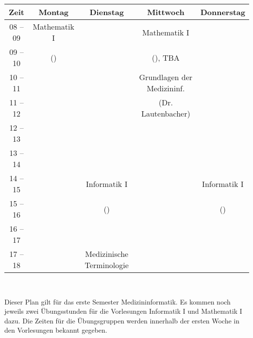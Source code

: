 \begin{minipage}{\textwidth}
    \footnotesize
\begin{center}
\begin{tabular}{|c|c|c|c|c|} 
	\hline
	Zeit    & Montag       & Dienstag             & Mittwoch                          & Donnerstag                          \\ 
	\hline\hline
	08 – 09 & Mathematik I &                      & Mathematik I                      &                                   \\ 
	\cline{1-1}\cline{3-3}\cline{5-5}
	09 – 10 & (\Matheprof)      &                      & (\Matheprof), TBA                           &   \\ 
	\hline
	10 – 11 &              &                      &     Grundlagen der Medizininf.                              &                                   \\ 
	\cline{1-3}\cline{5-5}
	11 – 12 &              &                      &    (Dr. Lautenbacher)             &                                   \\ 
	\hline
	12 – 13 &              &                      &                                   &                                   \\ 
	\hline
	13 – 14 &              &                      &                                   &                                   \\ 
	\hline
	14 – 15 &              & Informatik I  &  &      Informatik I                             \\ 
	\cline{1-2}\cline{4-4}
	15 – 16 &              & (\Infoprof)              &          &  (\Infoprof)                \\ 
	\hline
	16 – 17 &              &                      &                                   &                                   \\ 
	\hline
	17 – 18 &              &   Medizinische Terminologie    &  &                                   \\
	\hline
\end{tabular}
    ~\\
\scriptsize %
\end{center}
\end{minipage}
Dieser Plan gilt für das erste Semester Medizininformatik. Es kommen noch jeweils zwei Übungsstunden für die Vorlesungen 
Informatik I und Mathematik I dazu. Die Zeiten für die Übungsgruppen werden innerhalb der ersten Woche in den Vorlesungen bekannt gegeben.
